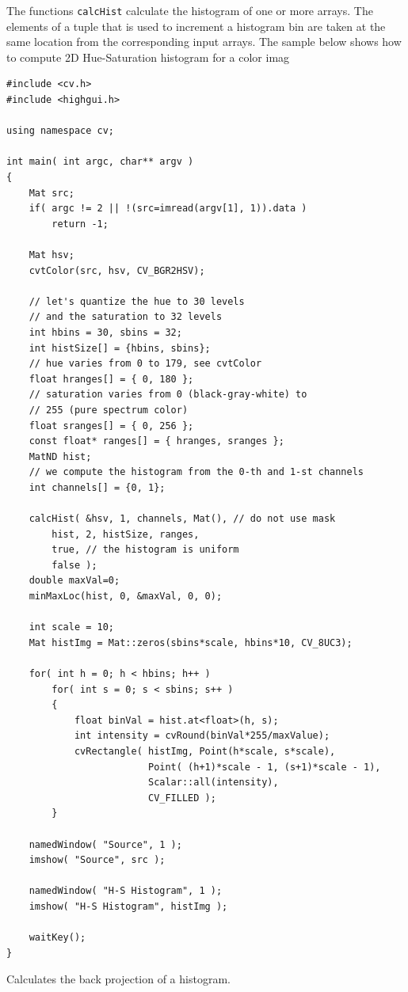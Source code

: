 The functions \texttt{calcHist} calculate the histogram of one or more
arrays. The elements of a tuple that is used to increment
a histogram bin are taken at the same location from the corresponding
input arrays. The sample below shows how to compute 2D Hue-Saturation histogram for a color imag

\begin{lstlisting}
#include <cv.h>
#include <highgui.h>

using namespace cv;

int main( int argc, char** argv )
{
    Mat src;
    if( argc != 2 || !(src=imread(argv[1], 1)).data )
        return -1;

    Mat hsv;
    cvtColor(src, hsv, CV_BGR2HSV);

    // let's quantize the hue to 30 levels
    // and the saturation to 32 levels
    int hbins = 30, sbins = 32;
    int histSize[] = {hbins, sbins};
    // hue varies from 0 to 179, see cvtColor
    float hranges[] = { 0, 180 };
    // saturation varies from 0 (black-gray-white) to
    // 255 (pure spectrum color)
    float sranges[] = { 0, 256 };
    const float* ranges[] = { hranges, sranges };
    MatND hist;
    // we compute the histogram from the 0-th and 1-st channels
    int channels[] = {0, 1};
    
    calcHist( &hsv, 1, channels, Mat(), // do not use mask
        hist, 2, histSize, ranges,
        true, // the histogram is uniform
        false );
    double maxVal=0;
    minMaxLoc(hist, 0, &maxVal, 0, 0);
    
    int scale = 10;
    Mat histImg = Mat::zeros(sbins*scale, hbins*10, CV_8UC3);        

    for( int h = 0; h < hbins; h++ )
        for( int s = 0; s < sbins; s++ )
        {
            float binVal = hist.at<float>(h, s);
            int intensity = cvRound(binVal*255/maxValue);
            cvRectangle( histImg, Point(h*scale, s*scale),
                         Point( (h+1)*scale - 1, (s+1)*scale - 1),
                         Scalar::all(intensity),
                         CV_FILLED );
        }

    namedWindow( "Source", 1 );
    imshow( "Source", src );

    namedWindow( "H-S Histogram", 1 );
    imshow( "H-S Histogram", histImg );

    waitKey();
}
\end{lstlisting}


Calculates the back projection of a histogram.


